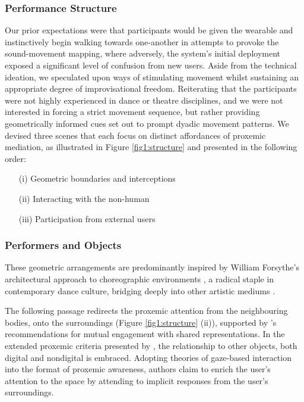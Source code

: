 \subsubsection{Performance Structure}
\label{sec:structure}

Our prior expectations were that participants would be given the wearable and instinctively begin walking towards one-another in attempts to provoke the sound-movement mapping, where adversely, the system's initial deployment exposed a significant level of confusion from new users. Aside from the technical ideation, we speculated upon ways of stimulating movement whilst sustaining an appropriate degree of improvisational freedom. Reiterating that the participants were not highly experienced in dance or theatre disciplines, and we were not interested in forcing a strict movement sequence, but rather providing geometrically informed cues set out to prompt dyadic movement patterns. We devised three scenes that each focus on distinct affordances of proxemic mediation, as illustrated in Figure \ref{fig1:structure} and presented in the following order:

\begin{itemize}[align = left]
    \item[(i)] Geometric boundaries and interceptions 
    \item[(ii)] Interacting with the non-human
    \item[(iii)] Participation from external users
\end{itemize}

\subsubsection{Performers and Objects}
\label{sec:structure_2}

These geometric arrangements are predominantly inspired by William Forsythe's architectural approach to choreographic environments \citep{forsythe_dance_1999}, a radical staple in contemporary dance culture, bridging deeply into other artistic mediums \citep{clark_geometry_2014}. 

The following passage redirects the proxemic attention from the neighbouring bodies, onto the surroundings (Figure \ref{fig1:structure} (ii)), supported by \citeauthor{bryan-kinns_mutual_2013}'s \citeyear{bryan-kinns_mutual_2013} recommendations for mutual engagement with shared representations. In the extended proxemic criteria presented by \cite{ballendat_proxemic_2010}, the relationship to other objects, both digital and nondigital is embraced. Adopting theories of gaze-based interaction into the format of proxemic awareness, authors claim to enrich the user's attention to the space by attending to implicit responses from the user's surroundings.
 
